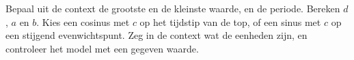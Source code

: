 \begin{werkwijze}
Bepaal uit de context de grootste en de kleinste waarde, en de periode. Bereken $d$, $a$ en $b$. Kies een cosinus met $c$ op het tijdstip van de top, of een sinus met $c$ op een stijgend evenwichtspunt. Zeg in de context wat de eenheden zijn, en controleer het model met een gegeven waarde.
\end{werkwijze}

\begin{oefeningen}

\end{oefeningen}

\opdrachtenkop

\begin{oefeningen}


























\end{oefeningen}

